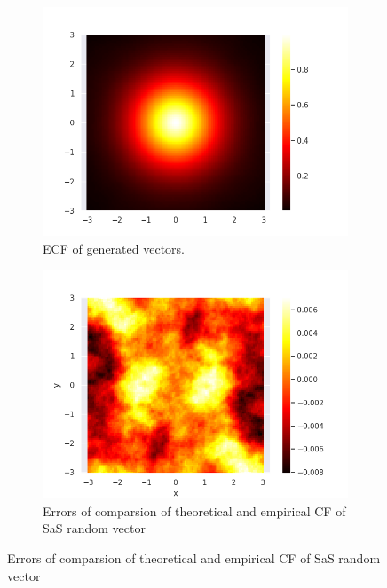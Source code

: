 \documentclass{article}
\begin{document}
	\begin{figure}
		\centering
		\begin{subfigure}[H]{0.49\textwidth}
			\centering
			\includegraphics[width=1\linewidth]{images/ex_2_ecf}
			\caption{ECF of generated vectors.}\label{7}
		\end{subfigure}
		\hfill
		\begin{subfigure}[H]{0.49\textwidth}
			\centering
			\includegraphics[width=1\linewidth]{images/ex_2_error_heatmap}
			\caption{Errors of comparsion of theoretical and empirical CF of SaS random vector}\label{8}
		\end{subfigure}
	\end{figure}
\end{document}
